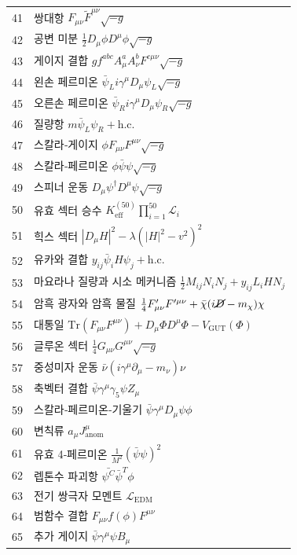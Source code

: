 \documentclass[11pt,a4paper]{article}
\begin{document}
\begin{longtable}{r l}
		41 & 쌍대항 $F_{\mu\nu}\tilde{F}^{\mu\nu}\sqrt{-g}$ \\
		42 & 공변 미분 $\frac{1}{2}D_\mu\phi D^\mu\phi\sqrt{-g}$ \\
		43 & 게이지 결합 $g f^{abc}A^a_\mu A^b_\nu F^{c\mu\nu}\sqrt{-g}$ \\
		44 & 왼손 페르미온 $\bar{\psi}_L i\gamma^\mu D_\mu\psi_L\sqrt{-g}$ \\
		45 & 오른손 페르미온 $\bar{\psi}_R i\gamma^\mu D_\mu\psi_R\sqrt{-g}$ \\
		46 & 질량항 $m\bar{\psi}_L\psi_R + \text{h.c.}$ \\
		47 & 스칼라‑게이지 $\phi F_{\mu\nu}F^{\mu\nu}\sqrt{-g}$ \\
		48 & 스칼라‑페르미온 $\phi\bar{\psi}\psi\sqrt{-g}$ \\
		49 & 스피너 운동 $D_\mu\psi^\dagger D^\mu\psi\sqrt{-g}$ \\
		50 & 유효 섹터 승수 $K^{(50)}_{\mathrm{eff}}\prod_{i=1}^{50}\mathcal{L}_i$ \\
		51 & 힉스 섹터 $|D_\mu H|^2 - \lambda(|H|^2 - v^2)^2$ \\
		52 & 유카와 결합 $y_{ij}\bar{\psi}_i H\psi_j + \text{h.c.}$ \\
		53 & 마요라나 질량과 시소 메커니즘 $\frac{1}{2}M_{ij}N_i N_j + y_{ij}L_i H N_j$ \\
		54 & 암흑 광자와 암흑 물질 $\frac{1}{4}F'_{\mu\nu}F'^{\mu\nu} + \bar{\chi}(i\cancel{D} - m_\chi)\chi$ \\
		55 & 대통일 $\mathrm{Tr}(F_{\mu\nu}F^{\mu\nu}) + D_\mu\Phi D^\mu\Phi - V_{\text{GUT}}(\Phi)$ \\
		56 & 글루온 섹터 $\frac{1}{4}G_{\mu\nu}G^{\mu\nu}\sqrt{-g}$ \\
		57 & 중성미자 운동 $\bar{\nu}(i\gamma^\mu\partial_\mu - m_\nu)\nu$ \\
		58 & 축벡터 결합 $\bar{\psi}\gamma^\mu\gamma_5\psi Z_\mu$ \\
		59 & 스칼라‑페르미온‑기울기 $\bar{\psi}\gamma^\mu D_\mu\psi\phi$ \\
		60 & 변칙류 $a_\mu J^\mu_{\text{anom}}$ \\
		61 & 유효 4‑페르미온 $\frac{1}{M^2}(\bar{\psi}\psi)^2$ \\
		62 & 렙톤수 파괴항 $\bar{\psi^C}\bar{\psi}^T\phi$ \\
		63 & 전기 쌍극자 모멘트 $\mathcal{L}_{\text{EDM}}$ \\
		64 & 범함수 결합 $F_{\mu\nu}f(\phi)F^{\mu\nu}$ \\
		65 & 추가 게이지 $\bar{\psi}\gamma^\mu\psi B_\mu$ \\

\end{longtable}
\end{document}
